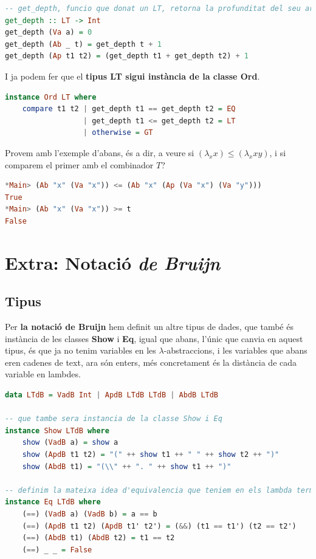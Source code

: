 \documentclass[10pt,a4paper]{article}
\begin{document}
\begin{lstlisting}[language=Haskell]
-- get_depth, funcio que donat un LT, retorna la profunditat del seu arbre de parsing
get_depth :: LT -> Int
get_depth (Va a) = 0
get_depth (Ab _ t) = get_depth t + 1
get_depth (Ap t1 t2) = (get_depth t1 + get_depth t2) + 1
\end{lstlisting}

I ja podem fer que el \textbf{tipus LT sigui instància de la classe Ord}.

\begin{lstlisting}[language=Haskell]
instance Ord LT where
    compare t1 t2 | get_depth t1 == get_depth t2 = EQ
                  | get_depth t1 <= get_depth t2 = LT
                  | otherwise = GT
\end{lstlisting}

Provem amb l'exemple d'abans, és a dir, a veure si $(\lambda_x x) \leq (\lambda_x x y)$, i si comparem el primer amb el combinador $T$?

\begin{lstlisting}[language=Haskell]
*Main> (Ab "x" (Va "x")) <= (Ab "x" (Ap (Va "x") (Va "y")))
True
*Main> (Ab "x" (Va "x")) >= t
False
\end{lstlisting}

\clearpage

\section{Extra: Notació \textit{de Bruijn}}

\subsection{Tipus}

Per \textbf{la notació de Bruijn} hem definit un altre tipus de dades, que també és instància de les classes \textbf{Show} i \textbf{Eq}, igual que abans, l'únic que canvia en aquest tipus, és que ja no tenim variables en les $\lambda$-abstraccions, i les variables que abans eren cadenes de text, ara són enters, més concretament és la distància de cada variable en lambdes.

\begin{lstlisting}[language=Haskell]
data LTdB = VadB Int | ApdB LTdB LTdB | AbdB LTdB

-- que tambe sera instancia de la classe Show i Eq
instance Show LTdB where
    show (VadB a) = show a
    show (ApdB t1 t2) = "(" ++ show t1 ++ " " ++ show t2 ++ ")"
    show (AbdB t1) = "(\\" ++ ". " ++ show t1 ++ ")"

-- definim la mateixa idea d'equivalencia que teniem en els lambda termes pels lambda termes amb notacio de Bruijn
instance Eq LTdB where
    (==) (VadB a) (VadB b) = a == b
    (==) (ApdB t1 t2) (ApdB t1' t2') = (&&) (t1 == t1') (t2 == t2')
    (==) (AbdB t1) (AbdB t2) = t1 == t2
    (==) _ _ = False
\end{lstlisting}
\end{document}
